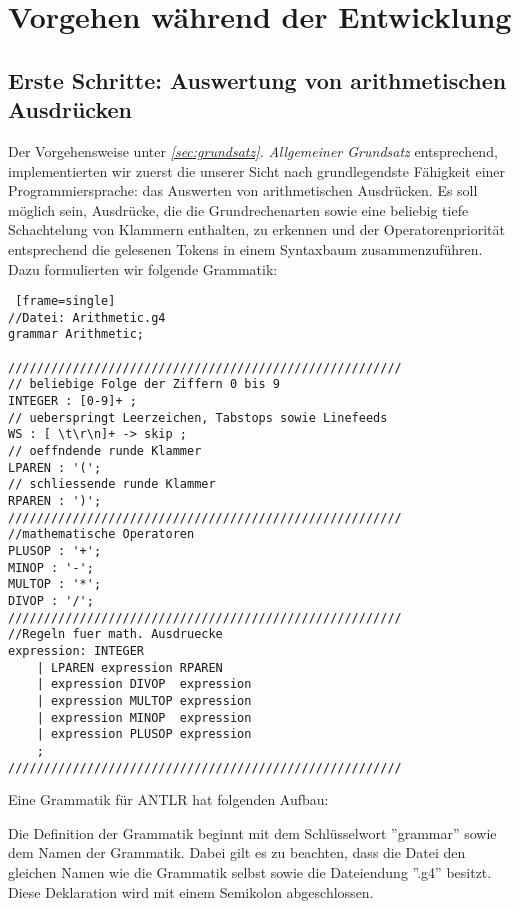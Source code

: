 
\section{Vorgehen während der Entwicklung}
\subsection{Erste Schritte: Auswertung von arithmetischen Ausdrücken}
\label{subsec:arithExp}
Der Vorgehensweise unter \textit{\ref{sec:grundsatz}. Allgemeiner Grundsatz} entsprechend, implementierten wir zuerst die unserer Sicht nach grundlegendste Fähigkeit einer Programmiersprache: das Auswerten von arithmetischen Ausdrücken. Es soll möglich sein, Ausdrücke, die die Grundrechenarten sowie eine beliebig tiefe Schachtelung von Klammern enthalten, zu erkennen und der Operatorenpriorität entsprechend die gelesenen Tokens in einem Syntaxbaum zusammenzuführen. Dazu formulierten wir folgende Grammatik:


\begin{lstlisting} [frame=single] 
//Datei: Arithmetic.g4
grammar Arithmetic;

///////////////////////////////////////////////////////
// beliebige Folge der Ziffern 0 bis 9
INTEGER : [0-9]+ ;        
// ueberspringt Leerzeichen, Tabstops sowie Linefeeds
WS : [ \t\r\n]+ -> skip ; 
// oeffndende runde Klammer
LPAREN : '(';		  	  
// schliessende runde Klammer
RPAREN : ')';		  	  
///////////////////////////////////////////////////////
//mathematische Operatoren
PLUSOP : '+';
MINOP : '-';
MULTOP : '*';
DIVOP : '/';
///////////////////////////////////////////////////////
//Regeln fuer math. Ausdruecke
expression: INTEGER					
	| LPAREN expression RPAREN		
	| expression DIVOP  expression  
	| expression MULTOP expression	
	| expression MINOP  expression 
	| expression PLUSOP expression 
	;			
///////////////////////////////////////////////////////

\end{lstlisting}

Eine Grammatik für ANTLR hat folgenden Aufbau:

Die Definition der Grammatik beginnt mit dem Schlüsselwort ''grammar'' sowie dem Namen der Grammatik. Dabei gilt es zu beachten, dass die Datei den gleichen Namen wie die Grammatik selbst sowie die Dateiendung ''.g4'' besitzt. Diese Deklaration wird mit einem Semikolon abgeschlossen.

